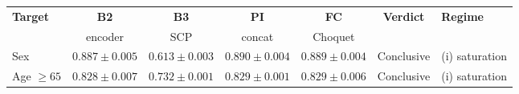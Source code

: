 \footnotesize
\setlength{\tabcolsep}{5pt}
\renewcommand{\arraystretch}{1.2}
\begin{tabular}{l cccc c l}
\toprule
\textbf{Target} & \textbf{B2} & \textbf{B3} & \textbf{PI} & \textbf{FC} &
  \textbf{Verdict} & \textbf{Regime} \\
 & {\scriptsize encoder} & {\scriptsize SCP} & {\scriptsize concat} &
   {\scriptsize Choquet} & & \\
\midrule
Sex           & $0.887{\pm}0.005$ & $0.613{\pm}0.003$ & $\mathbf{0.890}{\pm}0.004$ &
  $0.889{\pm}0.004$ & Conclusive & (i) saturation \\
Age $\geq 65$ & $0.828{\pm}0.007$ & $0.732{\pm}0.001$ &
  $\mathbf{0.829}{\pm}0.001$ & $\mathbf{0.829}{\pm}0.006$ & Conclusive & (i) saturation \\
\bottomrule
\end{tabular}
